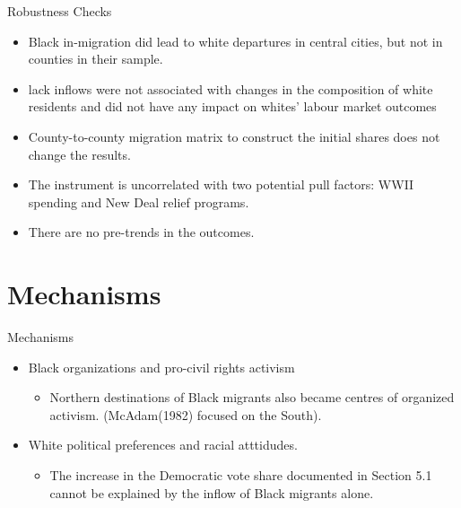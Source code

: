 \documentclass[dvipdfmx,11pt]{beamer}
\begin{document}
\begin{frame}{Robustness Checks}
  \begin{itemize}
    \item Black in-migration did lead to white departures in central cities, but not in counties in their sample.
    \item lack inflows were not associated with changes in the composition of white residents and did not have any impact on whites' labour market outcomes
    \item County-to-county migration matrix to construct the initial shares does not change the results.
    \item The instrument is uncorrelated with two potential pull factors: WWII spending and New Deal relief programs.
    \item There are no pre-trends in the outcomes.
  \end{itemize}
\end{frame}

\section{Mechanisms}
\frame{\sectionpage}

\begin{frame}{Mechanisms}
  \begin{itemize}
    \item Black organizations and pro-civil rights activism
    \begin{itemize}
      \item Northern destinations of Black migrants also became centres of organized activism. (McAdam(1982) focused on the South).
    \end{itemize}
    \item White political preferences and racial atttidudes.
    \begin{itemize}
      \item The increase in the Democratic vote share documented in Section 5.1 cannot be explained by the inflow of Black migrants alone.
    \end{itemize}
  \end{itemize}
\end{frame}
\end{document}
